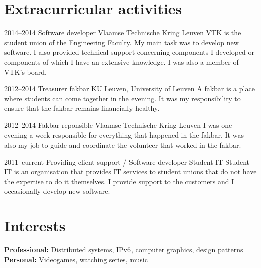 \documentclass[]{friggeri-cv} %
\begin{document}

\section{Extracurricular activities}

\begin{entrylist}
\entry
{2014--2014}
{Software developer}
{Vlaamse Technische Kring Leuven}
{VTK is the student union of the Engineering Faculty. My main task was to develop new software. I also provided technical support concerning components I developed or components of which I have an extensive knowledge. I was also a member of VTK’s board.}

\entry
{2012--2014}
{Treasurer fakbar}
{KU Leuven, University of Leuven}
{A fakbar is a place where students can come together in the evening. It was my responsibility to ensure that the fakbar remains financially healthy.}

\entry
{2012--2014}
{Fakbar reponsible}
{Vlaamse Technische Kring Leuven}
{I was one evening a week responsible for everything that happened in the fakbar. It was also my job to guide and coordinate the volunteer that worked in the fakbar.}

\entry
{2011--current}
{Providing client support / Software developer}
{Student IT}
{Student IT is an organisation that provides IT services to student unions that do not have the expertise to do it themselves. I provide support to the customers and I occasionally develop new software.}

\end{entrylist}



\section{Interests}

\textbf{Professional:} Distributed systems, IPv6, computer graphics, design patterns\\
\textbf{Personal:} Videogames, watching series, music
\end{document}
